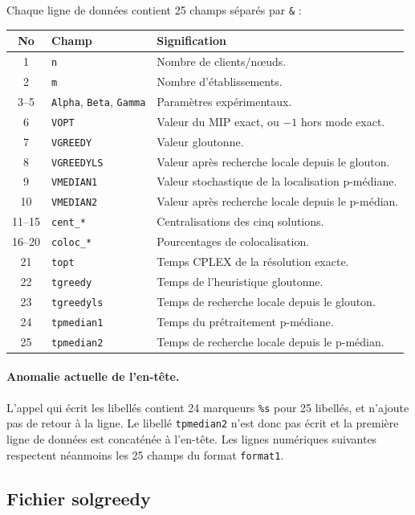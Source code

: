 \documentclass[11pt,a4paper]{article}
\newcommand{\code}[1]{\texttt{#1}}
\begin{document}
Chaque ligne de données contient 25 champs séparés par \code{\&} :
\begin{longtable}{clp{8.5cm}}
\toprule
No & Champ & Signification\\
\midrule
\endhead
1 & \code{n} & Nombre de clients/nœuds.\\
2 & \code{m} & Nombre d'établissements.\\
3--5 & \code{Alpha}, \code{Beta}, \code{Gamma} & Paramètres expérimentaux.\\
6 & \code{VOPT} & Valeur du MIP exact, ou $-1$ hors mode exact.\\
7 & \code{VGREEDY} & Valeur gloutonne.\\
8 & \code{VGREEDYLS} & Valeur après recherche locale depuis le glouton.\\
9 & \code{VMEDIAN1} & Valeur stochastique de la localisation p-médiane.\\
10 & \code{VMEDIAN2} & Valeur après recherche locale depuis le p-médian.\\
11--15 & \code{cent\_*} & Centralisations des cinq solutions.\\
16--20 & \code{coloc\_*} & Pourcentages de colocalisation.\\
21 & \code{topt} & Temps CPLEX de la résolution exacte.\\
22 & \code{tgreedy} & Temps de l'heuristique gloutonne.\\
23 & \code{tgreedyls} & Temps de recherche locale depuis le glouton.\\
24 & \code{tpmedian1} & Temps du prétraitement p-médiane.\\
25 & \code{tpmedian2} & Temps de recherche locale depuis le p-médian.\\
\bottomrule
\end{longtable}

\paragraph{Anomalie actuelle de l'en-tête.}
L'appel qui écrit les libellés contient 24 marqueurs \code{\%s} pour 25
libellés, et n'ajoute pas de retour à la ligne. Le libellé
\code{tpmedian2} n'est donc pas écrit et la première ligne de données est
concaténée à l'en-tête. Les lignes numériques suivantes respectent néanmoins
les 25 champs du format \code{format1}.

\subsection{Fichier solgreedy}
\end{document}
